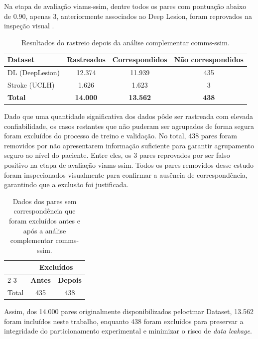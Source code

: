 Na etapa de avaliação via\acrshort{ms-ssim}, dentre todos os pares com pontuação abaixo de 0.90, apenas 3, anteriormente associados ao Deep Lesion, foram reprovados na inspeção visual .

\begin{table}[H]
    \centering
    \caption{Resultados do rastreio depois da análise complementar com\acrshort{ms-ssim}.}
    \label{tab:rastreio_pos_msssim}
    \begin{tabular}{lccc}
        \hline
        \textbf{Dataset} & \textbf{Rastreados} & \textbf{Correspondidos} & \textbf{Não correspondidos} \\
        \hline
        DL (DeepLesion) & 12.374 & 11.939 & 435 \\
        Stroke (UCLH)   & 1.626  & 1.623  & 3   \\
        \hline
        \textbf{Total}  & \textbf{14.000} & \textbf{13.562} & \textbf{438} \\
        \hline
    \end{tabular}
\end{table}

Dado que uma quantidade significativa dos dados pôde ser rastreada com elevada confiabilidade, os casos restantes que não puderam ser agrupados de forma segura foram excluídos do processo de treino e validação. No total, 438 pares foram removidos por não apresentarem informação suficiente para garantir agrupamento seguro ao nível do paciente. Entre eles, os 3 pares reprovados por ser falso positivo na etapa de avaliação via\acrshort{ms-ssim}. Todos os pares removidos desse estudo foram inspecionados visualmente para confirmar a ausência de correspondência, garantindo que a exclusão foi justificada.

\begin{table}[H]
    \centering
    \caption{Dados dos pares sem correspondência que foram excluídos antes e após a análise complementar com\acrshort{ms-ssim}.}
    \label{tab:cluster_excluidos}
    \begin{tabular}{lcc}
        \hline
        & \multicolumn{2}{c}{\textbf{Excluídos}} \\
        \cline{2-3}
        & \textbf{Antes} & \textbf{Depois} \\
        \hline
        Total    & 435 & 438 \\
        \hline
    \end{tabular}
\end{table}

Assim, dos 14.000 pares originalmente disponibilizados pelo\acrshort{ctmar} Dataset, 13.562 foram incluídos neste trabalho, enquanto 438 foram excluídos para preservar a integridade do particionamento experimental e minimizar o risco de \textit{data leakage}.

